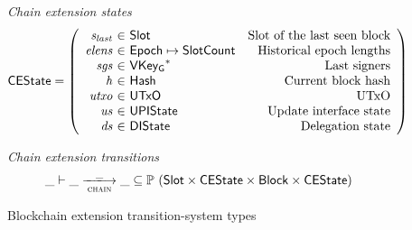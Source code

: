 \documentclass[11pt,a4paper]{article}
\newcommand{\powerset}[1]{\mathbb{P}~#1}
\newcommand{\var}[1]{\mathit{#1}}
\newcommand{\type}[1]{\mathsf{#1}}
\newcommand{\trans}[2]{\xlongrightarrow[\textsc{#1}]{#2}}
\newcommand{\seqof}[1]{#1^{*}}
\newcommand{\partialf}{\mapsto}
\newcommand{\Hash}{\type{Hash}}  %
\newcommand{\Slot}{\type{Slot}}
\newcommand{\SlotCount}{\type{SlotCount}}
\newcommand{\Block}{\type{Block}}
\newcommand{\VKeyGen}{\type{VKey_G}}
\begin{document}
\begin{figure}[ht]
  \emph{Chain extension states}
  \begin{equation*}
    \CEState =
    \left(
      \begin{array}{r@{~\in~}lr}
        \var{s_{last}} & \Slot & \text{Slot of the last seen block} \\
        \var{elens} & \Epoch \partialf \SlotCount & \text{Historical epoch lengths} \\
        \var{sgs} & \seqof{\VKeyGen} & \text{Last signers}\\
        \var{h} & \Hash & \text{Current block hash} \\
        \var{utxo} & \UTxO & \text{UTxO} \\
        \var{us} & \UPIState & \text{Update interface state} \\
        \var{ds} & \DIState & \text{Delegation state}
      \end{array}
    \right)
  \end{equation*}

  \emph{Chain extension transitions}
  \begin{equation*}
    \_ \vdash \var{\_} \trans{chain}{\_} \var{\_} \subseteq
    \powerset (\Slot \times \CEState \times \Block \times \CEState)
  \end{equation*}

  \caption{Blockchain extension transition-system types}
  \label{fig:ts-types:chain-extension}
\end{figure}
\end{document}
